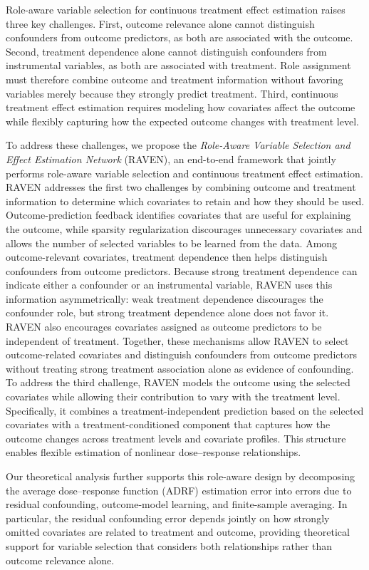 \documentclass[twoside]{article}
\theoremstyle{plain}
\theoremstyle{definition}
\theoremstyle{remark}
\newtheorem{proof sketch}[theorem]{Proof Sketch}
\begin{document}
{Role-aware variable selection for continuous treatment effect estimation raises three key challenges. 
First, outcome relevance alone cannot distinguish confounders from outcome predictors, as both are associated with the outcome. 
Second, treatment dependence alone cannot distinguish confounders from instrumental variables, as both are associated with treatment. 
Role assignment must therefore combine outcome and treatment information without favoring variables merely because they strongly predict treatment.
Third, continuous treatment effect estimation requires modeling how covariates affect the outcome while flexibly capturing how the expected outcome changes with treatment level. 


To address these challenges, we propose the \textit{Role-Aware Variable Selection and Effect Estimation Network} (RAVEN), an end-to-end framework that jointly performs role-aware variable selection and continuous treatment effect estimation.
RAVEN addresses the first two challenges by combining outcome and treatment information to determine which covariates to retain and how they should be used. Outcome-prediction feedback identifies covariates that are useful for explaining the outcome, while sparsity regularization discourages unnecessary covariates and allows the number of selected variables to be learned from the data.
Among outcome-relevant covariates, treatment dependence then helps distinguish confounders from outcome predictors. Because strong treatment dependence can indicate either a confounder or an instrumental variable, RAVEN uses this information asymmetrically: weak treatment dependence discourages the confounder role, but strong treatment dependence alone does not favor it. 
RAVEN also encourages covariates assigned as outcome predictors to be independent of treatment. 
Together, these mechanisms allow RAVEN to select outcome-related covariates and distinguish confounders from outcome predictors without treating strong treatment association alone as evidence of confounding. 
To address the third challenge, RAVEN models the outcome using the selected covariates while allowing their contribution to vary with the treatment level.
Specifically, it combines a treatment-independent prediction based on the selected covariates with a treatment-conditioned component that captures how the outcome changes across treatment levels and covariate profiles. This structure enables flexible estimation of nonlinear dose--response relationships.



Our theoretical analysis further supports this role-aware design by decomposing the average dose--response function (ADRF) estimation error into errors due to residual confounding, outcome-model learning, and finite-sample averaging.
In particular, the residual confounding error depends jointly on how strongly omitted covariates are related to treatment and outcome, providing theoretical support for variable selection that considers both relationships rather than outcome relevance alone.


}
\end{document}
